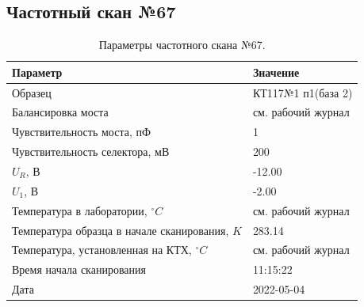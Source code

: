 \subsection{Частотный скан №67}
\begin{table}[!ht]
    \centering
    \caption{Параметры частотного скана №67.}
    \begin{tabular}{|l|l|}
        \hline
        Параметр                                       & Значение                  \\ \hline
        Образец                                        & КТ117№1 п1(база 2)        \\ \hline
        Балансировка моста                             & см. рабочий журнал        \\ \hline
        Чувствительность моста, пФ                     & 1                         \\ \hline
        Чувствительность селектора, мВ                 & 200                       \\ \hline
        $U_R$, В                                       & -12.00                    \\ \hline
        $U_1$, В                                       & -2.00                     \\ \hline
        Температура в лаборатории, $^\circ C$          & см. рабочий журнал        \\ \hline
        Температура образца в начале сканирования, $K$ & 283.14                    \\ \hline
        Температура, установленная на КТХ, $^\circ C$  & см. рабочий журнал        \\ \hline
        Время начала сканирования                      & 11:15:22                  \\ \hline
        Дата                                           & 2022-05-04                \\ \hline
    \end{tabular}
    \label{table:frequency_scan_67}
\end{table}

